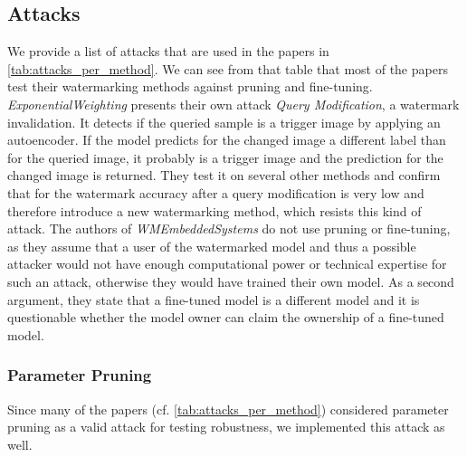 \subsection{Attacks} \label{sec:implementation_attack}

We provide a list of attacks that are used in the papers in \cref{tab:attacks_per_method}. We can see from that table that most of the papers test their watermarking methods against pruning and fine-tuning. \textit{ExponentialWeighting} presents their own attack \textit{Query Modification}, a watermark invalidation. It detects if the queried sample is a trigger image by applying an autoencoder. If the model predicts for the changed image a different label than for the queried image, it probably is a trigger image and the prediction for the changed image is returned.
They test it on several other methods and confirm that for \cite{zhang_protecting_2018, merrer_adversarial_2019, rouhani_deepsigns_2019} the watermark accuracy after a query modification is very low and therefore introduce a new watermarking method, which resists this kind of attack. The authors of \textit{WMEmbeddedSystems} do not use pruning or fine-tuning, as they assume that a user of the watermarked model and thus a possible attacker would not have enough computational power or technical expertise for such an attack, otherwise they would have trained their own model. As a second argument, they state that a fine-tuned model is a different model and it is questionable whether the model owner can claim the ownership of a fine-tuned model.  




\subsubsection{Parameter Pruning} \label{sec:implementation:pruning}
Since many of the papers (cf. \cref{tab:attacks_per_method}) considered parameter pruning as a valid attack for testing robustness, we implemented this attack as well. 

